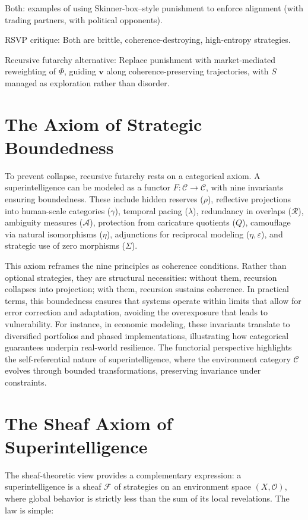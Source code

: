 \documentclass{article}
\begin{document}
Both: examples of using Skinner-box–style punishment to enforce alignment (with trading partners, with political opponents).

RSVP critique: Both are brittle, coherence-destroying, high-entropy strategies.

Recursive futarchy alternative: Replace punishment with market-mediated reweighting of $\Phi$, guiding $\mathbf{v}$ along coherence-preserving trajectories, with $S$ managed as exploration rather than disorder.

\section{The Axiom of Strategic Boundedness}

To prevent collapse, recursive futarchy rests on a categorical axiom. A superintelligence can be modeled as a functor $F:\mathcal{C}\to\mathcal{C}$, with nine invariants ensuring boundedness. These include hidden reserves ($\rho$), reflective projections into human-scale categories ($\gamma$), temporal pacing ($\lambda$), redundancy in overlaps ($\mathcal{R}$), ambiguity measures ($\mathcal{A}$), protection from caricature quotients ($Q$), camouflage via natural isomorphisms ($\eta$), adjunctions for reciprocal modeling ($\eta,\varepsilon$), and strategic use of zero morphisms ($\Sigma$).

This axiom reframes the nine principles as coherence conditions. Rather than optional strategies, they are structural necessities: without them, recursion collapses into projection; with them, recursion sustains coherence. In practical terms, this boundedness ensures that systems operate within limits that allow for error correction and adaptation, avoiding the overexposure that leads to vulnerability. For instance, in economic modeling, these invariants translate to diversified portfolios and phased implementations, illustrating how categorical guarantees underpin real-world resilience. The functorial perspective highlights the self-referential nature of superintelligence, where the environment category $\mathcal{C}$ evolves through bounded transformations, preserving invariance under constraints.

\section{The Sheaf Axiom of Superintelligence}

The sheaf-theoretic view provides a complementary expression: a superintelligence is a sheaf $\mathcal{F}$ of strategies on an environment space $(X,\mathcal{O})$, where global behavior is strictly less than the sum of its local revelations. The law is simple:
\end{document}
